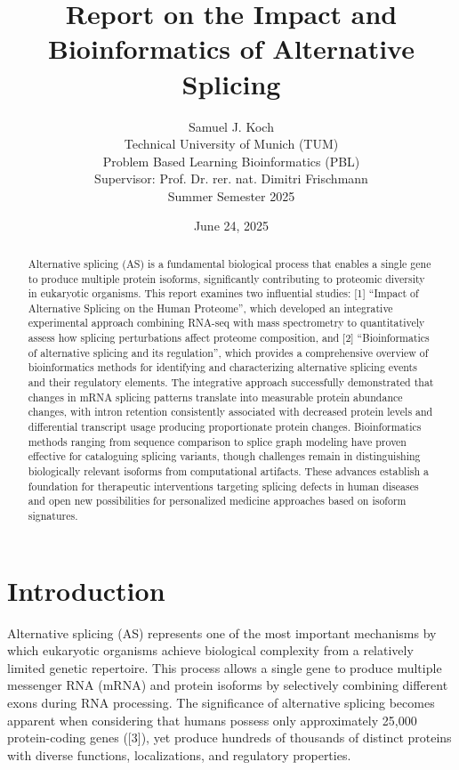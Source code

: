\documentclass[12pt,a4paper]{article}
\title{Report on the Impact and Bioinformatics of Alternative Splicing}
\author{Samuel J. Koch \\
        Technical University of Munich (TUM) \\
        Problem Based Learning Bioinformatics (PBL) \\
        Supervisor: Prof. Dr. rer. nat. Dimitri Frischmann \\
        Summer Semester 2025}
\date{June 24, 2025}
\begin{document}
\maketitle
\newpage

\doublespacing

\begin{abstract}
Alternative splicing (AS) is a fundamental biological process that enables a single gene to produce multiple protein isoforms, significantly contributing to proteomic diversity in eukaryotic organisms. This report examines two influential studies: [1] ``Impact of Alternative Splicing on the Human Proteome'', which developed an integrative experimental approach combining RNA-seq with mass spectrometry to quantitatively assess how splicing perturbations affect proteome composition, and [2] ``Bioinformatics of alternative splicing and its regulation'', which provides a comprehensive overview of bioinformatics methods for identifying and characterizing alternative splicing events and their regulatory elements. The integrative approach successfully demonstrated that changes in mRNA splicing patterns translate into measurable protein abundance changes, with intron retention consistently associated with decreased protein levels and differential transcript usage producing proportionate protein changes. Bioinformatics methods ranging from sequence comparison to splice graph modeling have proven effective for cataloguing splicing variants, though challenges remain in distinguishing biologically relevant isoforms from computational artifacts. These advances establish a foundation for therapeutic interventions targeting splicing defects in human diseases and open new possibilities for personalized medicine approaches based on isoform signatures.
\end{abstract}

\newpage

\tableofcontents
\newpage

\section{Introduction}

Alternative splicing (AS) represents one of the most important mechanisms by which eukaryotic organisms achieve biological complexity from a relatively limited genetic repertoire. This process allows a single gene to produce multiple messenger RNA (mRNA) and protein isoforms by selectively combining different exons during RNA processing. The significance of alternative splicing becomes apparent when considering that humans possess only approximately 25,000 protein-coding genes ([3]), yet produce hundreds of thousands of distinct proteins with diverse functions, localizations, and regulatory properties.
\end{document}
